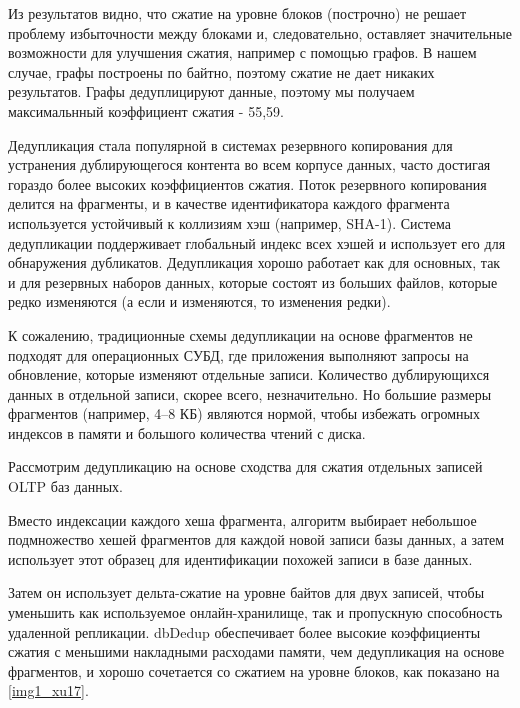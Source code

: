 \documentclass[12pt,a4paper]{article}
\begin{document}
Из результатов видно, что сжатие на уровне блоков (построчно) не решает проблему избыточности между блоками и, следовательно, оставляет значительные возможности для улучшения сжатия, например с помощью графов. В нашем случае, графы построены по байтно, поэтому сжатие не дает никаких результатов. Графы дедуплицируют данные, поэтому мы получаем максимальнный коэффициент сжатия - 55,59.

Дедупликация стала популярной в системах резервного копирования для устранения дублирующегося контента во всем корпусе данных, часто достигая гораздо более высоких коэффициентов сжатия. Поток резервного копирования делится на фрагменты, и в качестве идентификатора каждого фрагмента используется устойчивый к коллизиям хэш (например, SHA-1). Система дедупликации поддерживает глобальный индекс всех хэшей и использует его для обнаружения дубликатов. Дедупликация хорошо работает как для основных, так и для резервных наборов данных, которые состоят из больших файлов, которые редко изменяются (а если и изменяются, то изменения редки).

К сожалению, традиционные схемы дедупликации на основе фрагментов не подходят
для операционных СУБД, где приложения выполняют запросы на обновление, которые изменяют отдельные записи. Количество дублирующихся данных в отдельной записи, скорее всего, незначительно. Но большие размеры фрагментов (например, 4–8 КБ) являются нормой, чтобы избежать огромных индексов в памяти и большого количества чтений с диска.

Рассмотрим дедупликацию на основе сходства \cite{Xu15} для
сжатия отдельных записей OLTP баз данных.

Вместо индексации каждого хеша фрагмента,
алгоритм выбирает небольшое подмножество хешей фрагментов для каждой новой записи базы данных, а затем использует этот образец для идентификации похожей записи в базе данных.

Затем он использует дельта-сжатие на уровне байтов для
двух записей, чтобы уменьшить как используемое онлайн-хранилище, так и пропускную способность удаленной репликации. dbDedup обеспечивает более высокие коэффициенты сжатия с меньшими накладными расходами памяти, чем дедупликация на основе фрагментов, и хорошо сочетается
со сжатием на уровне блоков, как показано на \ref{img1_xu17}. 
\end{document}
